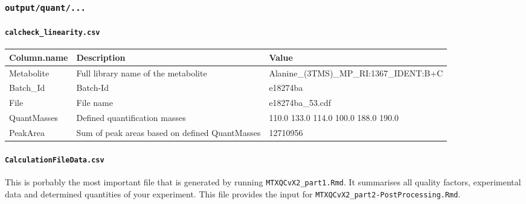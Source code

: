 \documentclass[]{book}
\let\oldparagraph\paragraph
\renewcommand{\paragraph}[1]{\oldparagraph{#1}\mbox{}}
\begin{document}
\hypertarget{outputquant...}{%
\subsubsection{\texorpdfstring{\texttt{output/quant/...}}{output/quant/...}}\label{outputquant...}}

\hypertarget{calcheck_linearity.csv}{%
\paragraph{\texorpdfstring{\texttt{calcheck\_linearity.csv}}{calcheck\_linearity.csv}}\label{calcheck_linearity.csv}}

\begin{tabu} to 
\toprule
Column.name & Description & Value\\
\midrule
{}  Metabolite & Full library name of the metabolite & Alanine\_(3TMS)\_MP\_RI:1367\_IDENT:B+C\\
Batch\_Id & Batch-Id & e18274ba\\
  File & File name & e18274ba\_53.cdf\\
QuantMasses & Defined quantification masses & 110.0 133.0 114.0 100.0 188.0 190.0\\
  PeakArea & Sum of peak areas based on defined QuantMasses & 12710956\\
\bottomrule
\end{tabu}

\hypertarget{calculationfiledata.csv}{%
\paragraph{\texorpdfstring{\texttt{CalculationFileData.csv}}{CalculationFileData.csv}}\label{calculationfiledata.csv}}

This is porbably the most important file that is generated by running \texttt{MTXQCvX2\_part1.Rmd}. It summarises all quality factors, experimental data and determined quantities of your experiment. This file provides the input for \texttt{MTXQCvX2\_part2-PostProcessing.Rmd}.
\end{document}
